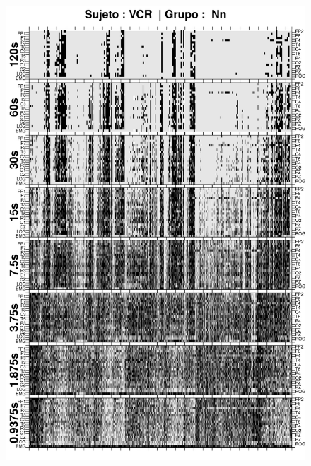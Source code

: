 \begin{figure}
\centering
\includegraphics[width=0.9\linewidth]
{./img_ejemplos/VCNNS1_comp_est_.png} 
\end{figure}

